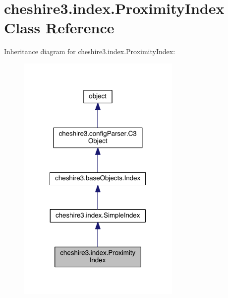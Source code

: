 \hypertarget{classcheshire3_1_1index_1_1_proximity_index}{\section{cheshire3.\-index.\-Proximity\-Index Class Reference}
\label{classcheshire3_1_1index_1_1_proximity_index}
}


Inheritance diagram for cheshire3.\-index.\-Proximity\-Index\-:
\nopagebreak
\begin{figure}[H]
\begin{center}
\leavevmode
\includegraphics[width=224pt]{classcheshire3_1_1index_1_1_proximity_index__inherit__graph}
\end{center}
\end{figure}


